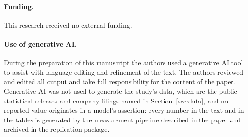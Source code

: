\paragraph{Funding.} This research received no external funding.
\fi

\paragraph{Use of generative AI.} During the preparation of this manuscript the authors used a
generative AI tool to assist with language editing and refinement of the text. The authors
reviewed and edited all output and take full responsibility for the content of the paper.
Generative AI was not used to generate the study's data, which are the public statistical
releases and company filings named in Section~\ref{sec:data}, and no reported value originates in
a model's assertion: every number in the text and in the tables is generated by the measurement
pipeline described in the paper and archived in the replication package.

